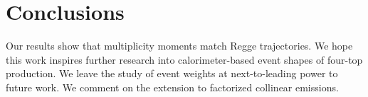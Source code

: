 \section{Conclusions}\label{sec:conclusions}

Our results show that multiplicity moments match Regge trajectories. We
hope this work inspires further research into calorimeter-based event
shapes of four-top production. We leave the study of event weights at
next-to-leading power to future work. We comment on the extension to
factorized collinear emissions.

